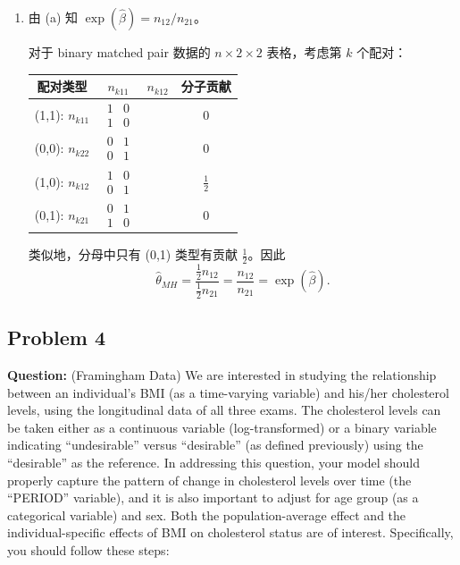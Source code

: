 \begin{enumerate}[label=(\alph*)]
\item 由 (a) 知 $\exp(\widehat{\beta}) = n_{12}/n_{21}$。

对于 binary matched pair 数据的 $n\times 2\times 2$ 表格，考虑第 $k$ 个配对：

\begin{center}
\begin{tabular}{c|cc|c}
\toprule
配对类型 & $n_{k11}$ & $n_{k12}$ & 分子贡献 \\
\midrule
(1,1): $n_{k11}$ & $\begin{smallmatrix}1 & 0\\1 & 0\end{smallmatrix}$ & & 0 \\
(0,0): $n_{k22}$ & $\begin{smallmatrix}0 & 1\\0 & 1\end{smallmatrix}$ & & 0 \\
(1,0): $n_{k12}$ & $\begin{smallmatrix}1 & 0\\0 & 1\end{smallmatrix}$ & & $\frac{1}{2}$ \\
(0,1): $n_{k21}$ & $\begin{smallmatrix}0 & 1\\1 & 0\end{smallmatrix}$ & & 0 \\
\bottomrule
\end{tabular}
\end{center}

类似地，分母中只有 (0,1) 类型有贡献 $\frac{1}{2}$。因此
\[
  \widehat{\theta}_{MH} = \frac{\frac{1}{2}n_{12}}{\frac{1}{2}n_{21}} = \frac{n_{12}}{n_{21}} = \exp(\widehat{\beta}).
\]
\end{enumerate}


\subsection{Problem 4}

\textbf{Question:} (Framingham Data) We are interested in studying the relationship between an individual's BMI (as a time-varying variable) and his/her cholesterol levels, using the longitudinal data of all three exams. The cholesterol levels can be taken either as a continuous variable (log-transformed) or a binary variable indicating ``undesirable'' versus ``desirable'' (as defined previously) using the ``desirable'' as the reference. In addressing this question, your model should properly capture the pattern of change in cholesterol levels over time (the ``PERIOD'' variable), and it is also important to adjust for age group (as a categorical variable) and sex. Both the population-average effect and the individual-specific effects of BMI on cholesterol status are of interest. Specifically, you should follow these steps:

